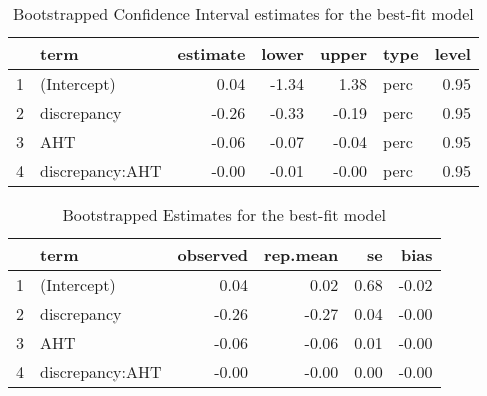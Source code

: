 \begin{table}[H]
\centering
\begin{tabular}{rlrrrlr}
  \hline
 & term & estimate & lower & upper & type & level \\ 
  \hline
1 & (Intercept) & 0.04 & -1.34 & 1.38 & perc & 0.95 \\ 
  2 & discrepancy & -0.26 & -0.33 & -0.19 & perc & 0.95 \\ 
  3 & AHT & -0.06 & -0.07 & -0.04 & perc & 0.95 \\ 
  4 & discrepancy:AHT & -0.00 & -0.01 & -0.00 & perc & 0.95 \\ 
   \hline
\end{tabular}
\caption{Bootstrapped Confidence Interval estimates for the best-fit model}
\label{Table:Bootstrapped estimates}
\end{table}

\begin{table}[h]
\centering
\begin{tabular}{rlrrrr}
  \hline
 & term & observed & rep.mean & se & bias \\ 
  \hline
1 & (Intercept) & 0.04 & 0.02 & 0.68 & -0.02 \\ 
  2 & discrepancy & -0.26 & -0.27 & 0.04 & -0.00 \\ 
  3 & AHT & -0.06 & -0.06 & 0.01 & -0.00 \\ 
  4 & discrepancy:AHT & -0.00 & -0.00 & 0.00 & -0.00 \\ 
   \hline
\end{tabular}
\caption{Bootstrapped Estimates for the best-fit model}
\end{table}